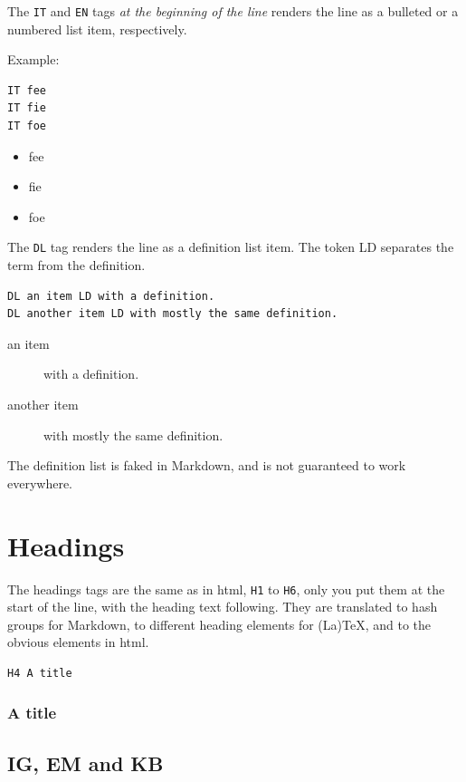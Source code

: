 The \texttt{IT} and \texttt{EN} tags \emph{at the beginning of the line} renders the line as a bulleted or a numbered list item, respectively.

Example:

\begin{verbatim}
IT fee
IT fie
IT foe
\end{verbatim}

\begin{itemize}
\item fee
\item fie
\item foe
\end{itemize}

The \texttt{DL} tag renders the line as a definition list item. The token LD separates the term from the definition.

\begin{verbatim}
DL an item LD with a definition.
DL another item LD with mostly the same definition.
\end{verbatim}

\begin{description}
\item[an item] with a definition.
\item[another item] with mostly the same definition.
\end{description}

The definition list is faked in Markdown, and is not guaranteed to work everywhere.

\chapter{Headings}
\label{headings}

The headings tags are the same as in html, \texttt{H1} to \texttt{H6}, only you put them at the start of the line, with the heading text following. They are translated to hash groups for Markdown, to different heading elements for (La)TeX, and to the obvious elements in html.

\begin{verbatim}
H4 A title
\end{verbatim}

\subsection{A title}
\label{a-title}

\section{IG, EM and KB}
\label{ig-em-and-kb}

